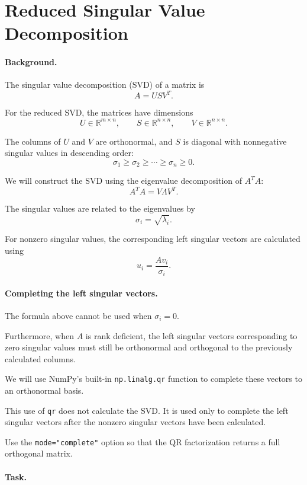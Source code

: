 \documentclass{ximera}
\begin{document}
\section{Reduced Singular Value Decomposition}

\paragraph{Background.}

The singular value decomposition (SVD) of a matrix is
\[
A=USV^T.
\]

For the reduced SVD, the matrices have dimensions
\[
U\in\mathbb{R}^{m\times n},\qquad
S\in\mathbb{R}^{n\times n},\qquad
V\in\mathbb{R}^{n\times n}.
\]

The columns of $U$ and $V$ are orthonormal, and $S$ is diagonal
with nonnegative singular values in descending order:
\[
\sigma_1\geq\sigma_2\geq\cdots\geq\sigma_n\geq0.
\]

We will construct the SVD using the eigenvalue decomposition
of $A^TA$:
\[
A^TA=V\Lambda V^T.
\]

The singular values are related to the eigenvalues by
\[
\sigma_i=\sqrt{\lambda_i}.
\]

For nonzero singular values, the corresponding left singular
vectors are calculated using
\[
u_i=\frac{Av_i}{\sigma_i}.
\]

\paragraph{Completing the left singular vectors.}

The formula above cannot be used when $\sigma_i=0$.

Furthermore, when $A$ is rank deficient, the left singular
vectors corresponding to zero singular values must still be
orthonormal and orthogonal to the previously calculated columns.

We will use NumPy's built-in \texttt{np.linalg.qr} function to
complete these vectors to an orthonormal basis.

This use of \texttt{qr} does not calculate the SVD. It is used
only to complete the left singular vectors after the nonzero
singular vectors have been calculated.

Use the \texttt{mode="complete"} option so that the QR
factorization returns a full orthogonal matrix.

\paragraph{Task.}
\end{document}
